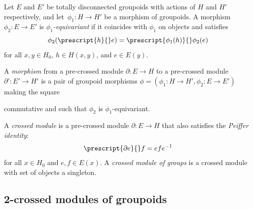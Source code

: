 \documentclass[a4paper, oneside]{amsart}
\numberwithin{equation}{subsection}
\theoremstyle{referencedlemma}
\theoremstyle{plain} %
\theoremstyle{remark}
\begin{document}
Let ${E}$ and ${E}'$ be totally disconnected groupoids with actions of ${H}$ and ${H}'$ respectively, and let~$\phi_1 : {H} \to {H}'$ be a morphism of groupoids. A morphism $\phi_2 : {E} \to {E}'$ is \emph{$\phi_1$-equivariant} if it coincides with $\phi_1$ on objects and satisfies
\begin{equation*}
\phi_2(\prescript{h}{}e) = \prescript{\phi_1(h)}{}\phi_2(e)
\end{equation*}
for all $x,y \in H_0$, $h\in H(x,y)$, and $e\in E(y)$.

A \emph{morphism} from a pre-crossed module $\partial \colon {E}\to {H}$ to a pre-crossed module $\partial'\colon {E}'\to {H}'$ is a pair of groupoid morphisms $\phi = (\phi_1\colon {H}\to {H}', \phi_2\colon {E}\to {E}')$ making the square 
\begin{center}
\end{center}
commutative and such that $\phi_2$ is $\phi_1$-equivariant.

A \emph{crossed module} is a pre-crossed module $\partial\colon {E}\to {H}$ that also satisfies the \emph{Peiffer identity}:
$$
\prescript{\partial e}{}f = efe^{-1}
$$
for all $x \in H_0$ and $e,f \in E(x)$. A \emph{crossed module of groups} is a crossed module with set of objects a singleton.

\subsection{2-crossed modules of groupoids} 
\end{document}
